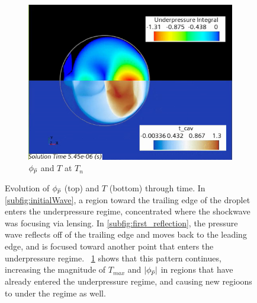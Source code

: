 \documentclass{UCF_ETD}
\begin{document}
\begin{figure}
\begin{subfigure}[b]{0.3\textwidth}
        \centering
        \includegraphics[width=\textwidth]{Figures/reflect_n.png}
        \caption{$\phi_{\Bar{p}}$ and $T$ at $T_{n}$}
        \label{subfig:n_reflections}
    \end{subfigure}
    \caption{Evolution of $\phi_{\Bar{p}}$ (top) and $T$ (bottom) through time. In \ref{subfig:initialWave}, a region toward the trailing edge of the droplet enters the underpressure regime, concentrated where the shockwave was focusing via lensing. In \ref{subfig:first_reflection}, the pressure wave reflects off of the trailing edge and moves back to the leading edge, and is focused toward another point that enters the underpressure regime. ~\ref{subfig:n_reflections} shows that this pattern continues, increasing the magnitude of $T_{max}$ and $|\phi_{\Bar{p}}|$ in regions that have already entered the underpressure regime, and causing new regioons to under the regime as well.}
\label{fig:underpressure_cav_time}
\end{figure}
\end{document}
